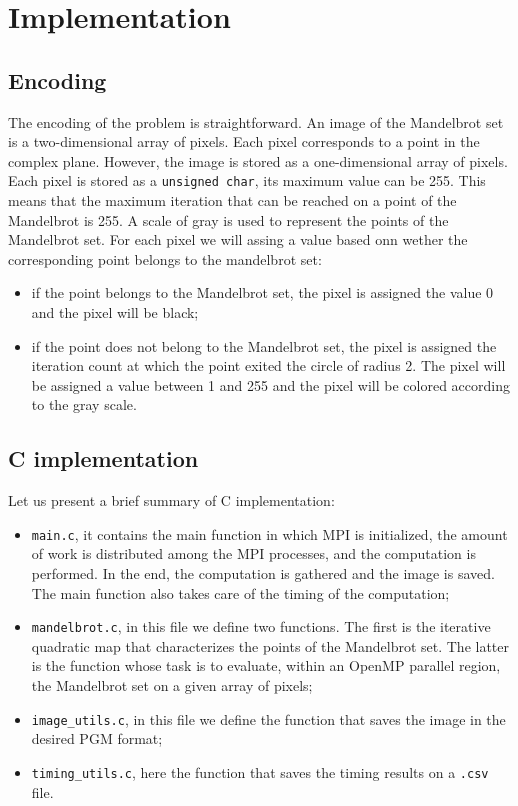 \section{Implementation}

\subsection{Encoding}
The encoding of the problem is straightforward. An image of the Mandelbrot set is a two-dimensional array of pixels. Each pixel corresponds to a point in the complex plane. However, the image is stored as a one-dimensional array of pixels. Each pixel is stored as a \texttt{unsigned char}, its maximum value can be 255. This means that the maximum iteration that can be reached on a point of the Mandelbrot is 255. A scale of gray is used to represent the points of the Mandelbrot set. For each pixel
we will assing a value based onn wether the corresponding point belongs to the mandelbrot set: 
\begin{itemize}
    \item if the point belongs to the Mandelbrot set, the pixel is assigned the value 0 and the pixel will be black;
    \item if the point does not belong to the Mandelbrot set, the pixel is assigned the iteration count at which the point exited the circle of radius 2. The pixel will be assigned a value between 1 and 255 and the pixel will be colored according to the gray scale.
\end{itemize}

\subsection{C implementation}
Let us present a brief summary of C implementation:
\begin{itemize}
    \item \texttt{main.c}, it contains the main function in which MPI is initialized, the amount of work is distributed among the MPI processes, and the computation is performed. In the end, the computation is gathered and the image is saved. The main function also takes care of the timing of the computation;
    \item \texttt{mandelbrot.c}, in this file we define two functions. The first is the iterative quadratic map that characterizes the points of the Mandelbrot set. The latter is  the function whose task is to evaluate, within an OpenMP parallel region, the Mandelbrot set on a given array of pixels;
    \item \texttt{image\_utils.c}, in this file we define the function that saves the image in the desired PGM format;
    \item \texttt{timing\_utils.c}, here the function that saves the timing results on a \texttt{.csv} file.
\end{itemize}


